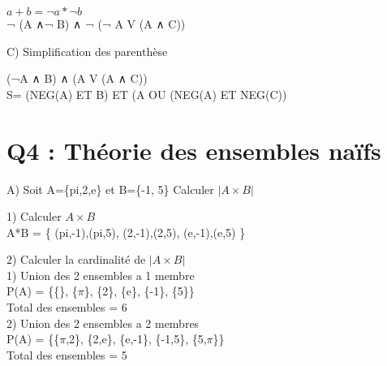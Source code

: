   $a+b = ¬ a * ¬ b$\\

  ¬ (A ∧¬ B) ∧ ¬ (¬ A V (A ∧ C)) \\

\begin{flushleft}
C) Simplification des parenthèse \\
\end{flushleft}

  (¬A ∧ B) ∧ (A V (A ∧ C)) \\

  S= (NEG(A) ET B) ET (A OU (NEG(A) ET NEG(C)) \\


\vspace{10mm} %

\section{Q4 : Théorie des ensembles naïfs}

\vspace{4mm} %

A) Soit A=\{pi,2,e\} et B=\{-1, 5\} Calculer ${|A\times B|}$ \\

\vspace{4mm} %

1) Calculer ${A\times B}$ \\

A*B = \{ (pi,-1),(pi,5), (2,-1),(2,5), (e,-1),(e,5) \}

\vspace{8mm} %

2) Calculer la cardinalité de ${|A\times B|}$ \\

1) Union des 2 ensembles a 1 membre \\

P(A) = \{\{\}, \{$\pi$\}, \{2\}, \{e\}, \{-1\}, \{5\}\} \\

Total des ensembles = 6 \\

2) Union des 2 ensembles a 2 membres \\

P(A) = \{\{$\pi$,2\}, \{2,e\}, \{e,-1\}, \{-1,5\}, \{5,$\pi$\}\} \\

Total des ensembles = 5 \\

